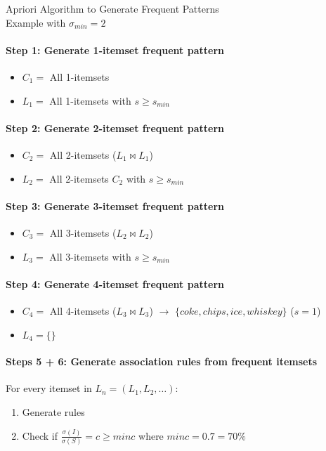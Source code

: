 \begin{KR}{Apriori Algorithm to Generate Frequent Patterns}\\
Example with $\sigma_{min} = 2$

\paragraph{Step 1: Generate 1-itemset frequent pattern}
\begin{itemize}
    \item $C_1 =$ All 1-itemsets
    \item $L_1 =$ All 1-itemsets with $s \geq s_{min}$
\end{itemize}

\paragraph{Step 2: Generate 2-itemset frequent pattern}
\begin{itemize}
    \item $C_2 =$ All 2-itemsets ($L_1 \bowtie L_1$)
    \item $L_2 =$ All 2-itemsets $C_2$ with $s \geq s_{min}$
\end{itemize}

\paragraph{Step 3: Generate 3-itemset frequent pattern}
\begin{itemize}
    \item $C_3 =$ All 3-itemsets ($L_2 \bowtie L_2$)
    \item $L_3 =$ All 3-itemsets with $s \geq s_{min}$
\end{itemize}

\paragraph{Step 4: Generate 4-itemset frequent pattern}
\begin{itemize}
    \item $C_4 =$ All 4-itemsets ($L_3 \bowtie L_3$) $\rightarrow$ $\{coke, chips, ice, whiskey\}$ ($s = 1$)
    \item $L_4 = \{\}$
\end{itemize}

\paragraph{Steps 5 + 6: Generate association rules from frequent itemsets}
For every itemset in $L_n = (L_1, L_2, \ldots)$:
\begin{enumerate}
    \item Generate rules
    \item Check if $\frac{\sigma(I)}{\sigma(S)} = c \geq minc$ where $minc = 0.7 = 70\%$
\end{enumerate}
\end{KR}

